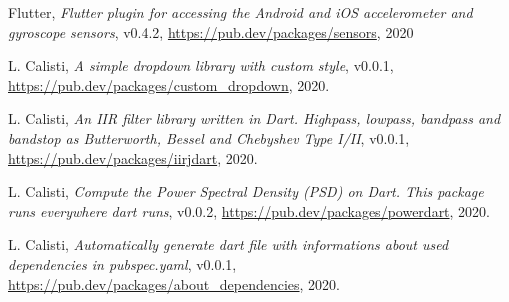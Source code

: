 \begin{thebibliography}{9}
Flutter,
{\em Flutter plugin for accessing the Android and iOS accelerometer and gyroscope sensors},
v0.4.2,
\url{https://pub.dev/packages/sensors},
2020

L. Calisti,
{\em A simple dropdown library with custom style},
v0.0.1,
\url{https://pub.dev/packages/custom_dropdown},
2020.

L. Calisti,
{\em An IIR filter library written in Dart. Highpass, lowpass, bandpass and bandstop as Butterworth, Bessel and Chebyshev Type I/II},
v0.0.1,
\url{https://pub.dev/packages/iirjdart},
2020.

L. Calisti,
{\em Compute the Power Spectral Density (PSD) on Dart. This package runs everywhere dart runs},
v0.0.2,
\url{https://pub.dev/packages/powerdart},
2020.

L. Calisti,
{\em Automatically generate dart file with informations about used dependencies in pubspec.yaml},
v0.0.1,
\url{https://pub.dev/packages/about_dependencies},
2020.
\end{thebibliography}
